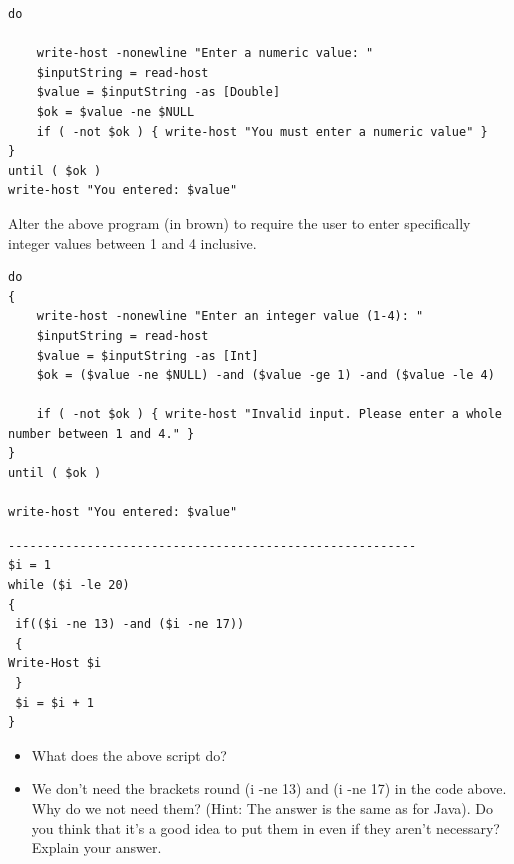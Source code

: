 \documentclass[a4paper]{article}
\begin{document}
\begin{verbatim}
do

    write-host -nonewline "Enter a numeric value: "
    $inputString = read-host
    $value = $inputString -as [Double]
    $ok = $value -ne $NULL
    if ( -not $ok ) { write-host "You must enter a numeric value" }
}
until ( $ok )
write-host "You entered: $value"
\end{verbatim}
\textcolor{green!50!black}{
    Alter the above program (in brown) to require the user to enter
    specifically integer values between 1 and 4 inclusive.
}
\begin{verbatim}
do
{
    write-host -nonewline "Enter an integer value (1-4): "
    $inputString = read-host
    $value = $inputString -as [Int]  
    $ok = ($value -ne $NULL) -and ($value -ge 1) -and ($value -le 4) 
    
    if ( -not $ok ) { write-host "Invalid input. Please enter a whole number between 1 and 4." }
}
until ( $ok )

write-host "You entered: $value"
\end{verbatim}

\begin{verbatim}
---------------------------------------------------------
$i = 1
while ($i -le 20)
{
 if(($i -ne 13) -and ($i -ne 17))
 {
Write-Host $i
 }
 $i = $i + 1
}
\end{verbatim}

\textcolor{green!50!black}{
\begin{itemize}
    \item What does the above script do?
    \item We don’t need the brackets round (i -ne 13) and (i -ne 17) in the code
above. Why do we not need them? (Hint: The answer is the same as for Java). Do
you think that it’s a good idea to put them in even if they aren’t necessary? Explain
your answer.
\end{itemize}
}
\end{document}
